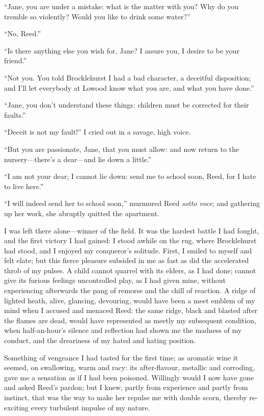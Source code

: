 \enquote{Jane, you are under a mistake: what is the matter with you?
	Why do you tremble so violently? Would you like to drink some water?}

\enquote{No, \Mrs{} Reed.}

\enquote{Is there anything else you wish for, Jane? I assure you, I
	desire to be your friend.}

\enquote{Not you. You told \Mr{} Brocklehurst I had a bad character, a
	deceitful disposition; and I'll let everybody at Lowood know what you
	are, and what you have done.}

\enquote{Jane, you don't understand these things: children must be
	corrected for their faults.}

\enquote{Deceit is not my fault!} I cried out in a savage, high voice.

\enquote{But you are passionate, Jane, that you must allow: and now
	return to the nursery---there's a dear---and lie down a little.}

\enquote{I am not your dear; I cannot lie down: send me to school soon,
	\Mrs{} Reed, for I hate to live here.}

\enquote{I will indeed send her to school soon,} murmured \Mrs{} Reed
\emph{sotto voce}; and gathering up her work, she abruptly quitted the
apartment.

I was left there alone---winner of the field. It was the hardest battle
I had fought, and the first victory I had gained: I stood awhile on the
rug, where \Mr{} Brocklehurst had stood, and I enjoyed my conqueror's
solitude. First, I smiled to myself and felt elate; but this fierce
pleasure subsided in me as fast as did the accelerated throb of my
pulses. A child cannot quarrel with its elders, as I had done; cannot
give its furious feelings uncontrolled play, as I had given mine,
without experiencing afterwards the pang of remorse and the chill of
reaction. A ridge of lighted heath, alive, glancing, devouring, would
have been a meet emblem of my mind when I accused and menaced \Mrs{} Reed:
the same ridge, black and blasted after the flames are dead, would have
represented as meetly my subsequent condition, when half-an-hour's
silence and reflection had shown me the madness of my conduct, and the
dreariness of my hated and hating position.

Something of vengeance I had tasted for the first time; as aromatic wine
it seemed, on swallowing, warm and racy: its after-flavour, metallic and
corroding, gave me a sensation as if I had been poisoned. Willingly
would I now have gone and asked \Mrs{} Reed's pardon; but I knew, partly
from experience and partly from instinct, that was the way to make her
repulse me with double scorn, thereby re-exciting every turbulent
impulse of my nature.


